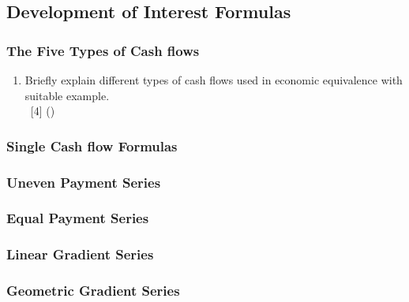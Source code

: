 \documentclass[12pt]{article}
\newcommand{\enter}{\\\textcolor{white}{1}}
\begin{document}
	\subsection{Development of Interest Formulas}
	\subsubsection{The Five Types of Cash flows}
	\begin{enumerate}
	\item Briefly explain different types of cash flows used in economic equivalence with suitable example.
	\enter\hfill[4] ()
	\end{enumerate}
	\subsubsection{Single Cash flow Formulas}
	\subsubsection{Uneven Payment Series}
	\subsubsection{Equal Payment Series}
	\subsubsection{Linear Gradient Series}
	\subsubsection{Geometric Gradient Series}
\end{document}
